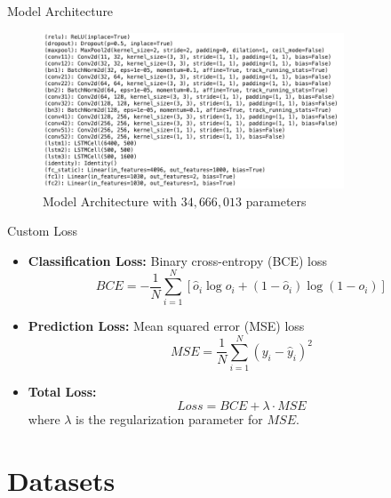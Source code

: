 \documentclass[10pt]{beamer}
\begin{document}
\begin{frame}{Model Architecture}
\begin{figure}
  \centering
    \includegraphics[width=0.8\textwidth]{Model_architecture.png}
    \caption{Model Architecture with $34,666,013$ parameters}
\end{figure}

\end{frame}



\begin{frame}{Custom Loss}
\begin{itemize}
    \item \textbf{Classification Loss:} Binary cross-entropy (BCE) loss
    \begin{equation*}
        BCE=-\frac{1}{N}\sum_{i=1}^{N}[\hat{o}_i\log o_i+(1-\hat{o}_i)\log(1-o_i)]
    \end{equation*}
    \item \textbf{Prediction Loss:} Mean squared error (MSE) loss
    \begin{equation*}
        MSE = \frac{1}{N}\sum_{i=1}^{N}(y_i-\hat{y}_i)^2
    \end{equation*}
    \item \textbf{Total Loss:} 
    \begin{equation*}
        Loss = BCE + \lambda \cdot MSE
    \end{equation*}
    where $\lambda$ is the regularization parameter for $MSE$.
\end{itemize}
\end{frame}


\section{Datasets}
\end{document}
